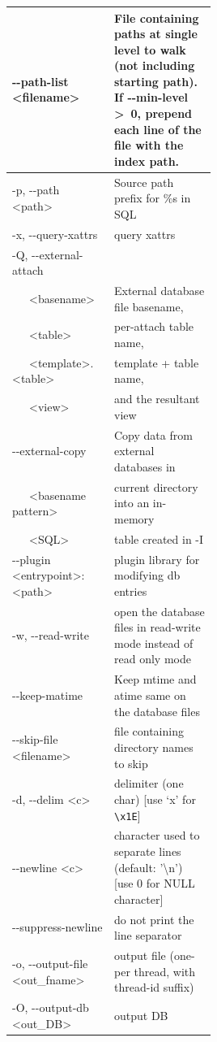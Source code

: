 \begin{longtable}{|l|p{0.5\linewidth}|}
  \hline
  -{}-path-list \textless filename\textgreater & File containing paths at
  single level to walk (not including starting path). If -{}-min-level
  \textgreater \ 0, prepend each line of the file with the index path. \\
  \hline
  -p, -{}-path \textless path\textgreater & Source path prefix for \%s in SQL \\
  \hline
  -x, -{}-query-xattrs & query xattrs \\
  \hline
  -Q, -{}-external-attach & \\
  \ \ \ \textless basename\textgreater & External database file basename, \\
  \ \ \ \textless table\textgreater & per-attach table name, \\
  \ \ \ \textless template\textgreater.\textless table\textgreater & template + table name, \\
  \ \ \ \textless view\textgreater & and the resultant view \\
  \hline
  -{}-external-copy & Copy data from external databases in \\
  \ \ \ \textless basename pattern\textgreater & current directory into an in-memory \\
  \ \ \ \textless SQL\textgreater & table created in -I \\
  \hline
  -{}-plugin \textless entrypoint\textgreater:\textless path\textgreater & plugin library for modifying db entries \\
  \hline
  -w, -{}-read-write & open the database files in read-write mode instead of read only mode \\
  \hline
  -{}-keep-matime & Keep mtime and atime same on the database files \\
  \hline
  -{}-skip-file \textless filename\textgreater & file containing directory names to skip \\
  \hline
  -d, -{}-delim \textless c\textgreater & delimiter (one char)  [use `x' for \texttt{\textbackslash x1E}] \\
  \hline
  -{}-newline \textless c\textgreater & character used to separate lines (default: '\textbackslash n') [use 0 for NULL character] \\
  \hline
  -{}-suppress-newline & do not print the line separator \\
  \hline
  -o, -{}-output-file \textless out\_fname\textgreater & output file (one-per thread, with thread-id suffix) \\
  \hline
  -O, -{}-output-db \textless out\_DB\textgreater & output DB \\

\end{longtable}
